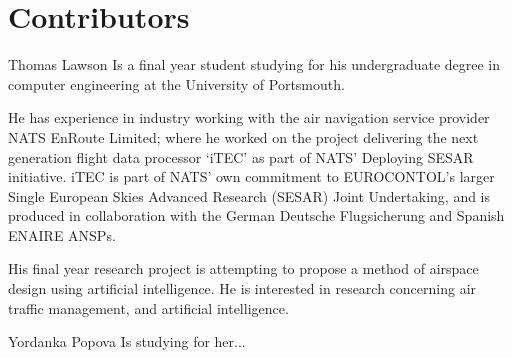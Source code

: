 \section*{Contributors}
\begin{IEEEbiography}%
{Thomas Lawson}
Is a final year student studying for his undergraduate degree in computer engineering at the University of Portsmouth.

He has experience in industry working with the air navigation service provider NATS EnRoute Limited; where he worked on the project delivering the next generation flight data processor `iTEC' as part of NATS' Deploying SESAR initiative. iTEC is part of NATS' own commitment to EUROCONTOL's larger Single European Skies Advanced Research (SESAR) Joint Undertaking, and is produced in collaboration with the German Deutsche Flugsicherung and Spanish ENAIRE ANSPs.

His final year research project is attempting to propose a method of airspace design using artificial intelligence. He is interested in research concerning air traffic management, and artificial intelligence.
\end{IEEEbiography}
\begin{IEEEbiography}%
{Yordanka Popova}
Is studying for her...
\end{IEEEbiography}